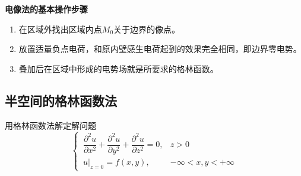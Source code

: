 \noindent \textbf{电像法的基本操作步骤}
\begin{enumerate}[\hspace*{2em} 1. ]
	\item 在区域外找出区域内点$M_0$关于边界的像点。\vspace*{-0.5em}
	\item 放置适量负点电荷，和原内壁感生电荷起到的效果完全相同，即边界零电势。\vspace*{-0.5em}
	\item 叠加后在区域中形成的电势场就是所要求的格林函数。
\end{enumerate}

\subsection{半空间的格林函数法}
用格林函数法解定解问题
\begin{equation}
	\begin{cases}
		\, \dfrac{\partial^2 u}{\partial x^2} + \dfrac{\partial^2 u}{\partial y^2} + \dfrac{\partial^2 u}{\partial z^2} = 0, & z > 0\\[0.5em]
		\, u\big|_{z=0} = f(x,y),& -\infty < x,y<+\infty
	\end{cases}
\end{equation}

